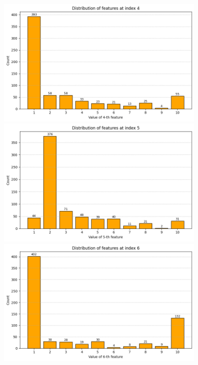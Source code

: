 \documentclass[polish,12pt,a4paper]{extarticle}
\begin{document}
\begin{figure}[h!]
    \centering
    \begin{minipage}[b]{0.3\textwidth}
    \includegraphics[width=0.9\textwidth]{img/feature_4.png}
    \end{minipage} \hspace{}
    \begin{minipage}[b]{0.3\textwidth}
    \includegraphics[width=0.9\textwidth]{img/feature_5.png}
    \end{minipage} \hspace{}
    \begin{minipage}[b]{0.3\textwidth}
    \includegraphics[width=0.9\textwidth]{img/feature_6.png}
    \end{minipage}
\end{figure} \smallskip \\
\end{document}
